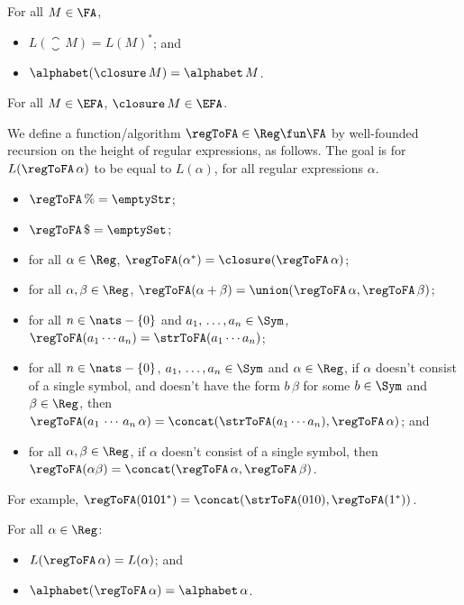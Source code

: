 \begin{proposition}
For all $M\in\FA$,
\begin{itemize}
\item $L(\closure\,M)=L(M)^*$; and

\item $\alphabet(\closure\,M)=\alphabet\,M$.
\end{itemize}
\end{proposition}

\begin{proposition}
For all $M\in\EFA$, $\closure\,M\in\EFA$.
\end{proposition}

We define a function/algorithm $\regToFA\in\Reg\fun\FA$ by well-founded
recursion on the height of regular expressions, as follows.
The goal is for $L(\regToFA\,\alpha)$ to be equal to $L(\alpha)$, for
all regular expressions $\alpha$.
\begin{itemize}
\item $\regToFA\,\% = \emptyStr$;

\item $\regToFA\,\$ = \emptySet$;

\item for all $\alpha\in\Reg$, $\regToFA(\alpha^*) =
  \closure(\regToFA\,\alpha)$;

\item for all $\alpha,\beta\in\Reg$, $\regToFA(\alpha+\beta) =
  \union(\regToFA\,\alpha,\regToFA\,\beta)$;

\item for all $n\in\nats-\{0\}$ and $a_1,\,\ldots,a_n\in\Sym$,
  $\regToFA(a_1\cdots a_n)=\strToFA(a_1\cdots a_n)$;

\item for all $n\in\nats-\{0\}$, $a_1,\,\ldots,a_n\in\Sym$ and
  $\alpha\in\Reg$, if $\alpha$ doesn't consist of a single symbol, and
  doesn't have the form $b\,\beta$ for some $b\in\Sym$ and
  $\beta\in\Reg$, then $\regToFA(a_1\,\cdots\,a_n\,\alpha)=
  \concat(\strToFA(a_1\cdots a_n),\regToFA\,\alpha)$; and

\item for all $\alpha,\beta\in\Reg$, if $\alpha$ doesn't consist of a
  single symbol, then $\regToFA(\alpha\beta)=
  \concat(\regToFA\,\alpha,\regToFA\,\beta)$.
\end{itemize}

For example, $\regToFA(\mathsf{0101^*})=
\concat(\strToFA(010),\regToFA(1^*))$.

\begin{theorem}
For all $\alpha\in\Reg$:
\begin{itemize}
\item $L(\regToFA\,\alpha)=L(\alpha)$; and

\item $\alphabet(\regToFA\,\alpha)=\alphabet\,\alpha$.
\end{itemize}
\end{theorem}

